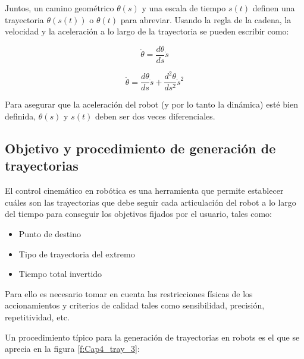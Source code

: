     Juntos, un camino geométrico $\theta(s)$ y una escala de tiempo $s(t)$  definen una trayectoria $\theta(s(t))$  o $\theta(t)$   para abreviar. Usando la regla de la cadena, la velocidad y la aceleración a lo largo de la trayectoria se pueden escribir como:


    \begin{equation}
        \dot{\theta} = \frac{d\theta}{ds} \dot{s}
        \label{eq:cap4_tray_7}
    \end{equation}  
    
        \begin{equation}
        \ddot{\theta} = \frac{d\theta}{ds} \ddot{s} + \frac{d^2\theta}{ds^2} \dot{s}^2
        \label{eq:cap4_tray_8}
    \end{equation}


    Para asegurar que la aceleración del robot (y por lo tanto la dinámica) esté bien definida, $\theta(s)$ y $s(t)$ deben ser dos veces diferenciales.

    \newpage
    
    \subsection{Objetivo y procedimiento de generación de trayectorias}
    
    El control cinemático en robótica es una herramienta que permite establecer cuáles son las trayectorias que debe seguir cada articulación del robot a lo largo del tiempo para conseguir los objetivos fijados por el usuario, tales como:
    
    \begin{itemize}
        \item 	Punto de destino
         \item  Tipo de trayectoria del extremo
         \item  Tiempo total invertido

    \end{itemize}
    
    
    Para ello es necesario tomar en cuenta las restricciones físicas de los accionamientos y criterios de calidad tales como sensibilidad, precisión, repetitividad, etc.
    
    Un procedimiento típico para la generación de trayectorias en robots es el que se aprecia en la figura \ref{f:Cap4_tray_3}:
    
